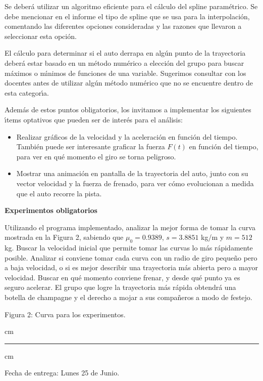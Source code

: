 Se deber\'a utilizar un algoritmo eficiente para el c\'alculo del spline
param\'etrico. Se debe mencionar en el informe el tipo de spline que se usa
para la interpolaci\'on, comentando las diferentes opciones consideradas
y las razones que llevaron a seleccionar esta opci\'on.

El c\'alculo para determinar si el auto derrapa en alg\'un punto de la
trayectoria deber\'a estar basado en un m\'etodo num\'erico a elecci\'on del
grupo para buscar m\'aximos o m\'\i nimos de funciones de una variable.
Sugerimos consultar con los docentes antes de utilizar alg\'un m\'etodo
num\'erico que no se encuentre dentro de esta categor\'\i a.

Adem\'as de estos puntos obligatorios, los invitamos a implementar los
siguientes \'\i tems optativos que pueden ser de inter\'es para el
an\'alisis:
\begin{itemize}
\item Realizar gr\'aficos de la velocidad y la aceleraci\'on en funci\'on
del tiempo. Tambi\'en puede ser interesante graficar la fuerza $F(t)$ en
funci\'on del tiempo, para ver en qu\'e momento el giro se torna peligroso.
\item Mostrar una animaci\'on en pantalla de la trayectoria del auto, junto
con su vector velocidad y la fuerza de frenado, para ver c\'omo evolucionan
a medida que el auto recorre la pista.
\end{itemize}

\vfil \eject

\textbf{Experimentos obligatorios}

Utilizando el programa implementado, analizar la mejor forma de tomar la
curva mostrada en la Figura 2, sabiendo que $\mu_0 = 0.9389$, $s = 3.8851$
kg/m y $m = 512$ kg. Buscar la velocidad inicial que permite
tomar las curvas lo m\'as r\'apidamente posible. Analizar si conviene tomar
cada curva con un radio de giro peque\~no pero a baja velocidad, o si es mejor
describir una trayectoria m\'as abierta pero a mayor velocidad. Buscar en
qu\'e momento conviene frenar, y desde qu\'e punto ya es seguro acelerar.
El grupo que logre la trayectoria m\'as r\'apida obtendr\'a una botella
de champagne y el derecho a mojar a sus compa\~neros a modo de festejo.

\begin{centering}

Figura 2: Curva para los experimentos. \\
\end{centering}

 cm
\hrule
{} cm

Fecha de entrega: Lunes 25 de Junio.

